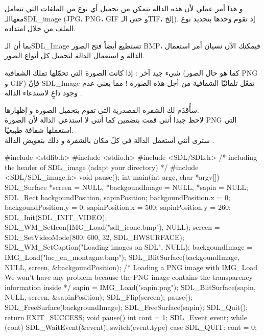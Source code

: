 و هذا أمر عملي لأن هذه الدالة تتمكن من تحميل أي نوع من الملفات التي تتعامل معهاالـ\textenglish{SDL\_image}
(\textenglish{JPG}، \textenglish{PNG}، \textenglish{GIF}
و حتى الـ\textenglish{TIF}،
إلخ). إذ تقوم وحدها بتحديد نوع الملف من خلال امتداده.
\begin{question}
بما أن الـ\textenglish{SDL\_Image}
تستطيع أيضاً فتح الصور 
\textenglish{BMP}،
فيمكنك الآن نسيان أمر استعمال الدالة 
و استعمال الدالة 
لتحميل كل أنواع الصور.
\end{question}

شيء جيد آخر : إذا كانت الصورة التي تحمّلها تملك الشفافية (كما هو حال الصور 
\textenglish{PNG}
و
\textenglish{GIF})
 فإنّ
\textenglish{SDL\_Image}
تفعّل تلقائيّا الشفافية من أجل هذه الصورة ! مما يعني عدم وجود داعٍ لاستدعاء الدالة 
.

سأٌقدّم لك الشفرة المصدرية التي تقوم بتحميل الصورة 
و إظهارها.\\
لاحظ جيدا أنني قمت بتضمين
كما أنني لا استدعي الدالة 
لأن الصورة
\textenglish{PNG}
التي استعملها شفافة طبيعيّا.\\
سترى أنني أستعمل الدالة 
في كلّ مكان بالشفرة و ذلك بتعويض الدالة 
.

\begin{Csource}
#include <stdlib.h>
#include <stdio.h>
#include <SDL/SDL.h>
/* including the header of SDL_image (adapt your directory) */
#include <SDL/SDL_image.h> 
void pause();
int main(int argc, char *argv[])
{
	SDL_Surface *screen = NULL, *backgoundImage = NULL, *sapin = NULL;
	SDL_Rect backgoundPosition, sapinPosition;
	backgoundPosition.x = 0;
	backgoundPosition.y = 0;
	sapinPosition.x = 500;
	sapinPosition.y = 260;
	SDL_Init(SDL_INIT_VIDEO);
	SDL_WM_SetIcon(IMG_Load("sdl_icone.bmp"), NULL);
	screen = SDL_SetVideoMode(800, 600, 32, SDL_HWSURFACE);
	SDL_WM_SetCaption("Loading images on SDL", NULL);
	backgoundImage = IMG_Load("lac_en_montagne.bmp");
	SDL_BlitSurface(backgoundImage, NULL, screen, &backgoundPosition);
	/* Loading a PNG image with IMG_Load
	We won't have any problem because the PNG image contains the transparency information inside */
	sapin = IMG_Load("sapin.png");
	SDL_BlitSurface(sapin, NULL, screen, &sapinPosition); 
	SDL_Flip(screen);
	pause();
	SDL_FreeSurface(backgroundImage);
	SDL_FreeSurface(sapin);
	SDL_Quit();
	return EXIT_SUCCESS;
} 
void pause()
{
	int cont = 1;
	SDL_Event event;
	while (cont)
	{
		SDL_WaitEvent(&event);
		switch(event.type)
		{
			case SDL_QUIT:
			cont = 0;
		}
	}
}
\end{Csource}

